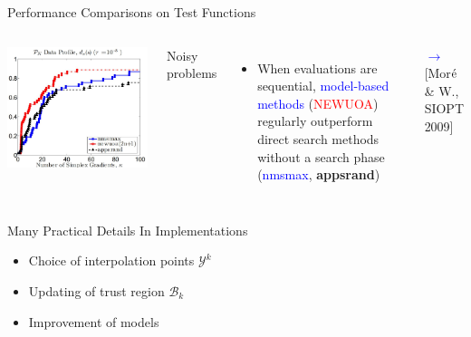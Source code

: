 \documentclass[handout,aspectratio=54]{beamer}
\numberwithin{theorem}{section}
\begin{document}
\begin{frame}{Performance Comparisons on Test Functions}
\begin{columns}
\includegraphics[width=\textwidth]{fig/33-2.jpg}

\begin{center}
Noisy problems
\end{center}

\begin{itemize}\footnotesize
\item When evaluations are sequential, \textcolor{blue}{model-based methods} (\textcolor{red}{NEWUOA}) regularly outperform direct search methods without a search phase (\textcolor{blue}{nmsmax}, \textbf{appsrand})
\end{itemize}
\scriptsize
\textcolor{blue}{$\rightarrow$}\textcolor[RGB]{128,0,128}{[Mor$\acute{\textup{e}}$ \& W., SIOPT 2009]}
\end{columns}
\end{frame}

\begin{frame}{Many Practical Details In Implementations}
\begin{itemize}
\item Choice of interpolation points $\mathcal{Y}^k$
\item Updating of trust region $\mathcal{B}_k$
\item Improvement of models
\end{itemize}

\vspace{5.5cm}
\end{frame}
\end{document}
